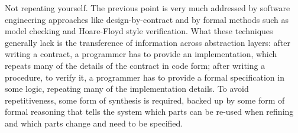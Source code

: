 \begin{paragraph}{Not repeating yourself.}
The previous point is very much addressed by software engineering approaches
like design-by-contract and by formal methods such as model checking and Hoare-Floyd
style verification.
What these techniques generally lack is the transference of information across
abstraction layers:
after writing a contract, a programmer has to provide an implementation,
which repeats many of the details of the contract in code form;
after writing a procedure, to verify it, a programmer has to provide a formal
specification in some logic, repeating many of the implementation details.
To avoid repetitiveness, some form of synthesis is required, backed up by some
form of formal reasoning that tells the system which parts can be re-used when
refining and which parts change and need to be specified.
\end{paragraph}

